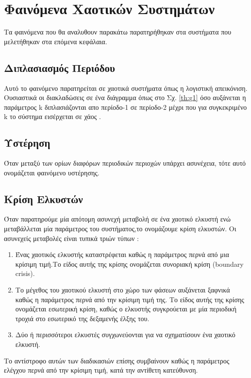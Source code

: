 \clearpage

\section{Φαινόμενα Χαοτικών Συστημάτων}
Τα φαινόμενα που θα αναλυθουν παρακάτω παρατηρήθηκαν στα συστήματα που μελετήθηκαν στα επόμενα κεφάλαια.

\subsection{Διπλασιασμός Περιόδου}

Αυτό το φαινόμενο παρατηρείται σε χαοτικά συστήματα όπως η λογιστική απεικόνιση. Ουσιαστικά οι διακλαδώσεις σε ένα διάγραμμα όπως στο Σχ. \ref{th:g1} όσο αυξάνεται η παράμετρος k διπλασιάζονται απο περίοδο-1 σε περίοδο-2 μέχρι που για συγκεκριμένο k το σύστημα εισέρχεται σε χάος \cite{b5}.

\subsection{Υστέρηση}
Όταν μεταξύ των ορίων διαφόρων περιοδικών περιοχών υπάρχει ασυνέχεια, τότε αυτό ονομάζεται φαινόμενο υστέρησης.

\subsection{Κρίση Ελκυστών}

Όταν παρατηρούμε μία απότομη ασυνεχή μεταβολή σε ένα χαοτικό ελκυστή
ενώ μεταβάλλεται μία παράμετρος του συστήματος,το ονομάζουμε κρίση ελκυστών. 
Οι ασυνεχείς μεταβολές είναι τυπικά τριών τύπων \cite{b5} :
\begin{enumerate}
	\item Ένας χαοτικός ελκυστής καταστρέφεται καθώς η παράμετρος περνά από μια κρίσιμη τιμή.Το είδος αυτής της κρίσης ονομάζεται συνοριακή κρίση (boundary crisis).
	\item Το μέγεθος του χαοτικού ελκυστή στο χώρο των φάσεων αυξάνεται ξαφνικά καθώς η παράμετρος περνά από την κρίσιμη τιμή της. Το είδος αυτής της κρίσης ονομάζεται
	εσωτερική κρίση, καθώς ο ελκυστής συγκρούεται με μία περιοδική τροχιά στο εσωτερικό της δεξαμενής έλξης του.
	\item Δύο ή περισσότεροι ελκυστές συγχωνεύονται για να σχηματίσουν ένα χαοτικό ελκυστή. 
\end{enumerate}
Το αντίστροφο αυτών των διαδικασιών επίσης συμβαίνουν καθώς η παράμετρος ελέγχου περνά από την κρίσιμη τιμή, κατά την αντίθετη κατεύθυνση.

